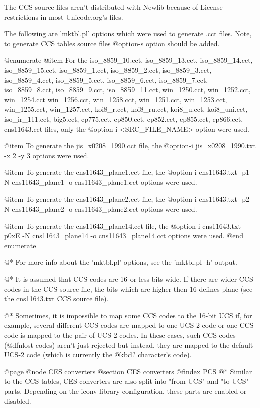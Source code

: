 The CCS source files aren't distributed with Newlib because of License
restrictions in most Unicode.org's files.

The following are 'mktbl.pl' options which were used to generate .cct
files. Note, to generate CCS tables source files @option{-s} option
should be added.

@enumerate
@item For the iso_8859_10.cct, iso_8859_13.cct, iso_8859_14.cct, iso_8859_15.cct,
iso_8859_1.cct, iso_8859_2.cct, iso_8859_3.cct, iso_8859_4.cct,
iso_8859_5.cct, iso_8859_6.cct, iso_8859_7.cct, iso_8859_8.cct,
iso_8859_9.cct, iso_8859_11.cct, win_1250.cct, win_1252.cct, win_1254.cct
win_1256.cct, win_1258.cct, win_1251.cct,
win_1253.cct, win_1255.cct, win_1257.cct,
koi8_r.cct, koi8_ru.cct, koi8_u.cct, koi8_uni.cct, iso_ir_111.cct,
big5.cct, cp775.cct, cp850.cct, cp852.cct, cp855.cct, cp866.cct, cns11643.cct
files, only the @option{-i <SRC_FILE_NAME>} option were used.

@item To generate the jis_x0208_1990.cct file, the
@option{-i jis_x0208_1990.txt -x 2 -y 3} options were used.

@item To generate the cns11643_plane1.cct file, the
@option{-i cns11643.txt -p1 -N cns11643_plane1  -o cns11643_plane1.cct}
options were used.

@item To generate the cns11643_plane2.cct file, the
@option{-i cns11643.txt -p2 -N cns11643_plane2  -o cns11643_plane2.cct}
options were used.

@item To generate the cns11643_plane14.cct file, the
@option{-i cns11643.txt -p0xE -N cns11643_plane14  -o cns11643_plane14.cct}
options were used.
@end enumerate

@*
For more info about the 'mktbl.pl' options, see the 'mktbl.pl -h' output.

@*
It is assumed that CCS codes are 16 or less bits wide. If there are wider CCS codes
in the CCS source file, the bits which are higher then 16 defines plane (see the
cns11643.txt CCS source file).

@*
Sometimes, it is impossible to map some CCS codes to the 16-bit UCS if, for example,
several different CCS codes are mapped to one UCS-2 code or one CCS code is mapped to
the pair of UCS-2 codes. In these cases, such CCS codes (@dfn{lost
codes}) aren't just rejected but instead, they are mapped to the default
UCS-2 code (which is currently the @kbd{?} character's code).





@page
@node CES converters
@section CES converters
@findex PCS
@*
Similar to the CCS tables, CES converters are also split into "from UCS"
and "to UCS" parts. Depending on the iconv library configuration, these
parts are enabled or disabled. 

